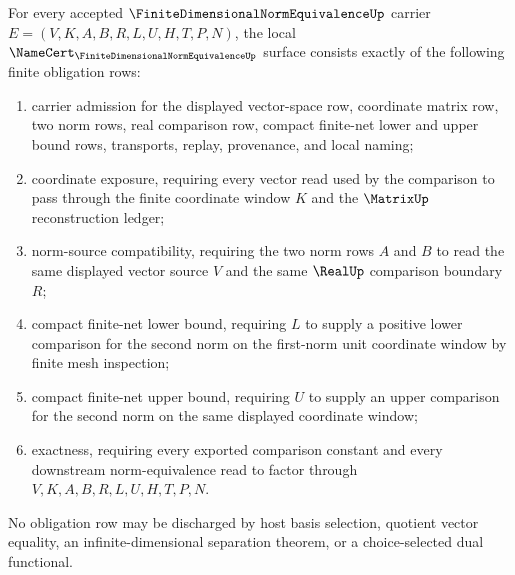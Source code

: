 \begin{theorem}
\label{thm:finite-dimensional-norm-equivalence-namecert-obligations}
For every accepted $\FiniteDimensionalNormEquivalenceUp$ carrier $E=(V,K,A,B,R,L,U,H,T,P,N)$, the local $\NameCert_{\FiniteDimensionalNormEquivalenceUp}$ surface consists exactly of the following finite obligation rows:
\begin{enumerate}
\item carrier admission for the displayed vector-space row, coordinate matrix row, two norm rows, real comparison row, compact finite-net lower and upper bound rows, transports, replay, provenance, and local naming;
\item coordinate exposure, requiring every vector read used by the comparison to pass through the finite coordinate window $K$ and the $\MatrixUp$ reconstruction ledger;
\item norm-source compatibility, requiring the two norm rows $A$ and $B$ to read the same displayed vector source $V$ and the same $\RealUp$ comparison boundary $R$;
\item compact finite-net lower bound, requiring $L$ to supply a positive lower comparison for the second norm on the first-norm unit coordinate window by finite mesh inspection;
\item compact finite-net upper bound, requiring $U$ to supply an upper comparison for the second norm on the same displayed coordinate window;
\item exactness, requiring every exported comparison constant and every downstream norm-equivalence read to factor through $V,K,A,B,R,L,U,H,T,P,N$.
\end{enumerate}
No obligation row may be discharged by host basis selection, quotient vector equality, an infinite-dimensional separation theorem, or a choice-selected dual functional.
\end{theorem}
